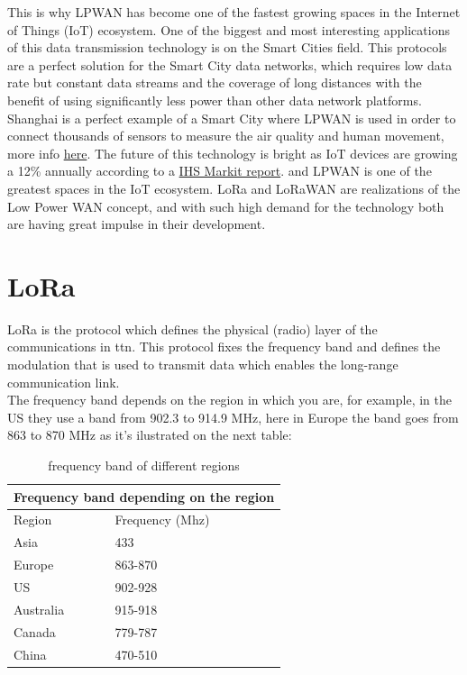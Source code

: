 This is why LPWAN has become one of the fastest growing spaces in
the Internet of Things (IoT) ecosystem. One of the biggest and most
interesting applications of this data transmission technology is on the
Smart Cities field. This protocols are a perfect solution for the Smart City
data networks, which requires low data rate but constant data streams
and the coverage of long distances with the benefit of using significantly
less power than other data network platforms. Shanghai is a perfect
example of a Smart City where LPWAN is used in order to connect
thousands of sensors to measure the air quality and human movement, more info 
\href{https://www.citiesforum.org/news/what-made-shanghai-the-worlds-no-1-smart-city}{here}.
The future of this technology is bright as IoT devices are growing a 12\%
annually according to a \href{https://cdn.ihs.com/www/pdf/IoT_ebook.pdf}{IHS Markit report}.
and LPWAN is one of the greatest spaces in the IoT ecosystem. LoRa and LoRaWAN are
realizations of the Low Power WAN concept, and with such high demand
for the technology both are having great impulse in their development.
\section{LoRa}
\label{sec:f-lora}
LoRa is the protocol which defines the physical (radio) layer of the
communications in \acrfull{ttn}. This protocol fixes the
frequency band and defines the modulation that is used to transmit data
which enables the long-range communication link.\\
The frequency band depends on the region in which you are, for
example, in the US they use a band from 902.3 to 914.9 MHz, here in
Europe the band goes from 863 to 870 MHz as it's ilustrated on the next table:\\

\begin{table}[htbp]
\centering
\setlength{\arrayrulewidth}{0.5mm}
\setlength{\tabcolsep}{18pt}
\renewcommand{\arraystretch}{2}
\begin{tabular}{ |p{5cm}|p{5cm}| }
\hline
\multicolumn{2}{|c|}{\cellcolor[HTML]{85C1E9}Frequency band depending on the region } \\
\hline
\cellcolor[HTML]{AED6F1} Region & \cellcolor[HTML]{AED6F1} Frequency (Mhz) \\
\hline
Asia & 433  \\
Europe & 863-870 \\
US & 902-928 \\
Australia & 915-918  \\
Canada & 779-787  \\
China & 470-510  \\
\hline
\end{tabular}
\caption{frequency band of different regions}
\end{table}

